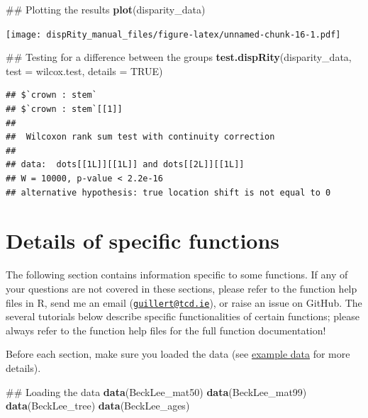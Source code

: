 \documentclass[]{book}
\newenvironment{Shaded}{\begin{snugshade}}{\end{snugshade}}
\newcommand{\KeywordTok}[1]{\textcolor[rgb]{0.13,0.29,0.53}{\textbf{#1}}}
\newcommand{\DataTypeTok}[1]{\textcolor[rgb]{0.13,0.29,0.53}{#1}}
\newcommand{\OtherTok}[1]{\textcolor[rgb]{0.56,0.35,0.01}{#1}}
\newcommand{\NormalTok}[1]{#1}
\theoremstyle{definition}
\theoremstyle{definition}
\theoremstyle{remark}
\begin{document}
\begin{Shaded}
\begin{Highlighting}[]
\NormalTok{## Plotting the results}
\KeywordTok{plot}\NormalTok{(disparity_data)}
\end{Highlighting}
\end{Shaded}

\texttt{[image: dispRity\_manual\_files/figure-latex/unnamed-chunk-16-1.pdf]}

\begin{Shaded}
\begin{Highlighting}[]
\NormalTok{## Testing for a difference between the groups}
\KeywordTok{test.dispRity}\NormalTok{(disparity_data, }\DataTypeTok{test =}\NormalTok{ wilcox.test, }\DataTypeTok{details =} \OtherTok{TRUE}\NormalTok{)}
\end{Highlighting}
\end{Shaded}

\begin{verbatim}
## $`crown : stem`
## $`crown : stem`[[1]]
## 
##  Wilcoxon rank sum test with continuity correction
## 
## data:  dots[[1L]][[1L]] and dots[[2L]][[1L]]
## W = 10000, p-value < 2.2e-16
## alternative hypothesis: true location shift is not equal to 0
\end{verbatim}

\chapter{Details of specific
functions}\label{details-of-specific-functions}

The following section contains information specific to some functions.
If any of your questions are not covered in these sections, please refer
to the function help files in R, send me an email
(\href{mailto:guillert@tcd.ie}{\nolinkurl{guillert@tcd.ie}}), or raise
an issue on GitHub. The several tutorials below describe specific
functionalities of certain functions; please always refer to the
function help files for the full function documentation!

Before each section, make sure you loaded the \citet{beckancient2014}
data (see \protect\hyperlink{example-data}{example data} for more
details).

\begin{Shaded}
\begin{Highlighting}[]
\NormalTok{## Loading the data}
\KeywordTok{data}\NormalTok{(BeckLee_mat50)}
\KeywordTok{data}\NormalTok{(BeckLee_mat99)}
\KeywordTok{data}\NormalTok{(BeckLee_tree)}
\KeywordTok{data}\NormalTok{(BeckLee_ages)}
\end{Highlighting}
\end{Shaded}
\end{document}
